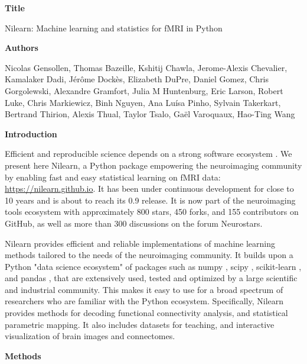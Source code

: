 \documentclass[a4paper]{article}
\begin{document}
\noindent \textbf{Title}

\medskip

\noindent Nilearn: Machine learning and statistics for fMRI in Python

\bigskip

\noindent \textbf{Authors}

\medskip

\noindent Nicolas Gensollen,  Thomas Bazeille, Kshitij Chawla, Jerome-Alexis Chevalier, Kamalaker Dadi, Jérôme Dockès, Elizabeth DuPre, Daniel Gomez, Chris Gorgolewski, Alexandre Gramfort, Julia M Huntenburg, Eric Larson, Robert Luke, Chris Markiewicz, Binh Nguyen, Ana Luísa Pinho, Sylvain Takerkart, Bertrand Thirion, Alexis Thual, Taylor Tsalo, Gaël Varoquaux, Hao-Ting Wang

\bigskip

\noindent \textbf{Introduction}

\medskip

\noindent Efficient and reproducible science depends on a strong software ecosystem \cite{Poldrack2019}. We present here Nilearn, a Python package empowering the neuroimaging community by enabling fast and easy statistical learning on fMRI data: \url{https://nilearn.github.io}. It has been under continuous development for close to 10 years and is about to reach its 0.9 release. It is now part of the neuroimaging tools ecosystem with approximately 800 stars, 450 forks, and 155 contributors on GitHub, as well as more than 300 discussions on the forum Neurostars.

\medskip

\noindent Nilearn provides efficient and reliable implementations of machine learning methods tailored to the needs of the neuroimaging community. It builds upon a Python "data science ecosystem" of packages such as numpy \cite{VanDerWalt2011}, scipy \cite{Oliphant2007}, scikit-learn \cite{Pedregosa2011}, and pandas \cite{McKinney2010}, that are extensively used, tested and optimized by a large scientific and industrial community. This makes it easy to use for a broad spectrum of researchers who are familiar with the Python ecosystem. Specifically, Nilearn provides methods  for decoding functional connectivity analysis, and statistical parametric mapping. It also includes datasets for teaching, and interactive visualization of brain images and connectomes.

\bigskip

\noindent \textbf{Methods}

\medskip
\end{document}
